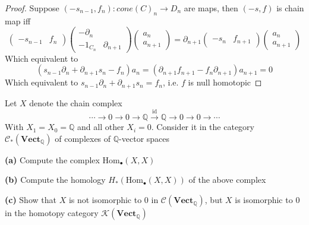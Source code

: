 \documentclass{article}
\newenvironment{exercise}[2][Exercise]{\begin{trivlist}
\item[\hskip \labelsep {\bfseries #1}\hskip \labelsep {\bfseries #2.}]}{\end{trivlist}}
\theoremstyle{definition}
\theoremstyle{remark}
\theoremstyle{definition}
\begin{document}
\begin{proof}
Suppose $(-s_{n-1},f_n):cone(C)_n\to D_n$ are maps, then $(-s,f)$ is chain map iff
\[\begin{pmatrix}
-s_{n-1} & f_n
\end{pmatrix}\begin{pmatrix}
-\partial_n & \\
-1_{C_n} & \partial_{n+1}
\end{pmatrix}\begin{pmatrix}
a_n \\
a_{n+1}
\end{pmatrix}=\partial_{n+1}\begin{pmatrix}
-s_n & f_{n+1}
\end{pmatrix}\begin{pmatrix}
a_n \\
a_{n+1}
\end{pmatrix}\]
Which equivalent to
\[(s_{n-1}\partial_n+\partial_{n+1}s_n-f_n)a_n=(\partial_{n+1}f_{n+1}-f_n\partial_{n+1})a_{n+1}=0\]
Which equivalent to $s_{n-1}\partial_n+\partial_{n+1}s_n=f_n$, i.e. $f$ is null homotopic
\end{proof}

\begin{exercise}{\textbf{1}}
Let $X$ denote the chain complex
\[\cdots\to0\to0\to\mathbb Q\xrightarrow{\mathrm{id}}\mathbb Q\to0\to0\to\cdots\]
With $X_1=X_0=\mathbb Q$ and all other $X_i=0$. Consider it in the category $\mathscr C_*(\mathbf{Vect}_\mathbb{Q})$ of complexes of $\mathbb Q$-vector spaces \par
\textbf{(a) }Compute the complex $\mathrm{Hom}_\bullet(X,X)$ \par
\textbf{(b) }Compute the homology $H_*(\mathrm{Hom}_\bullet(X,X))$ of the above complex \par
\textbf{(c) }Show that $X$ is not isomorphic to $0$ in $\mathscr C(\mathbf{Vect}_\mathbb{Q})$, but $X$ is isomorphic to $0$ in the homotopy category $\mathscr K(\mathbf{Vect}_\mathbb{Q})$
\end{exercise}
\end{document}
